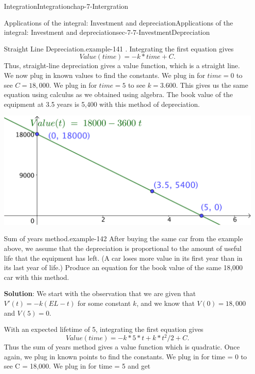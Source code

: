 \documentclass[oneside,10pt,]{book}
\newcommand{\terminology}[1]{\textbf{#1}}
\numberwithin{equation}{section}
\begin{document}
\begin{chapterptx}{Integration}{}{Integration}{}{}{chap-7-Intergration}
\begin{sectionptx}{Applications of the integral: Investment and depreciation}{}{Applications of the integral: Investment and depreciation}{}{}{sec-7-7-InvestmentDepreciation}
\begin{example}{Straight Line Depreciation.}{example-141}
. \hypertarget{p-3038}{}%
Integrating the first equation gives%
%
\begin{equation*}
Value(time)=-k*time+C.
\end{equation*}
\hypertarget{p-3039}{}%
Thus, straight-line depreciation gives a value function, which is a straight line.  We now plug in known values to find the constants.  We plug in for \(time = 0\) to see \(C = 18,000\).  We plug in for \(time = 5\) to see \(k = 3.600\).  This gives us the same equation using calculus as we obtained using algebra.  The book value of the equipment at 3.5 years is \textdollar{}5,400 with this method of depreciation.%
\begin{sidebyside}{1}{0.2}{0.2}{0}%
\begin{sbspanel}{0.6}%
\includegraphics[width=1\linewidth]{images/sec7-7-6.png}
\end{sbspanel}%
\end{sidebyside}%
\end{example}
\begin{example}{Sum of years method.}{example-142}%
\hypertarget{p-3040}{}%
After buying the same car from the example above, we assume that the depreciation is proportional to the amount of useful life that the equipment has left.  (A car loses more value in its first year than in its last year of life.)   Produce an equation for the book value of the same \textdollar{}18,000 car with this method.%
\par
\hypertarget{p-3041}{}%
\terminology{Solution}: We start with the observation that we are given that \(V' (t)=-k(EL-t)\) for some constant \(k\), and we know that \(V(0)=18,000\) and \(V(5)=0\).%
\par
\hypertarget{p-3042}{}%
With an expected lifetime of 5, integrating the first equation gives%
%
\begin{equation*}
Value(time)=-k*5*t+k*t^2/2+C.
\end{equation*}
\hypertarget{p-3043}{}%
Thus the sum of years method gives a value function which is quadratic.  Once again, we plug in known points to find the constants.  We plug in for time = 0 to see C = 18,000.  We plug in for time = 5 and get%

\end{example}
\end{sectionptx}
\end{chapterptx}
\end{document}
